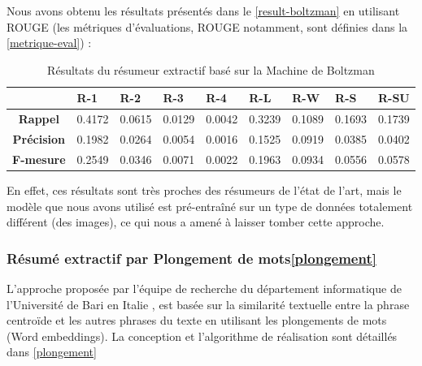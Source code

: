 \begin{itemize}[leftmargin=*]
                Nous avons obtenu les résultats présentés dans le \autoref{result-boltzman} en utilisant ROUGE (les métriques d'évaluations, ROUGE notamment, sont définies dans la \autoref{metrique-eval}) : 
                \begin{table}[H]
                    \begin{center}
                        \begin{tabular}{|c|C{1.2cm}|C{1.2cm}|C{1.2cm}|C{1.2cm}|C{1.2cm}|C{1.2cm}|C{1.2cm}|C{1.2cm}|}
                             & \textbf{R-1} &  \textbf{R-2} &  \textbf{R-3} &  \textbf{R-4} &  \textbf{R-L} &  \textbf{R-W} &  \textbf{R-S} &  \textbf{R-SU} \\
                            \hline
                            \textbf{Rappel} & 0.4172 & 0.0615 & 0.0129 & 0.0042 & 0.3239 & 0.1089 & 0.1693 & 0.1739 \\
                            \textbf{Précision} & 0.1982 & 0.0264 & 0.0054 & 0.0016 & 0.1525 & 0.0919 & 0.0385 & 0.0402 \\
                            \textbf{F-mesure} & 0.2549 & 0.0346 & 0.0071 & 0.0022 & 0.1963 & 0.0934 & 0.0556 & 0.0578 \\
                            \hline
                        \end{tabular}
                    \end{center}
                    \caption{Résultats du résumeur extractif basé sur la Machine de Boltzman}
                    \label{result-boltzman}
                \end{table}
                En effet, ces résultats sont très proches des résumeurs de l'état de l'art, mais le modèle que nous avons utilisé est pré-entraîné sur un type de données totalement différent (des images), ce qui nous a amené à laisser tomber cette approche.   
            \end{itemize}

        \subsubsection{Résumé extractif par Plongement de mots\ref{plongement}}
        L'approche proposée par l'équipe de recherche du département informatique de l'Université de Bari en Italie \cite{bari}, est basée sur la similarité textuelle entre la phrase centroïde et les autres phrases du texte en utilisant les plongements de mots (Word embeddings). La conception et l'algorithme de réalisation sont détaillés dans \ref{plongement}       

